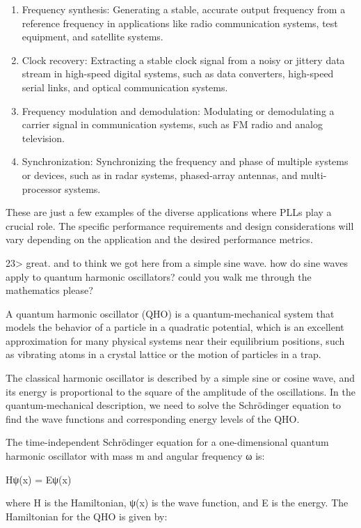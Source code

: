\documentclass[
]{article}
\begin{document}
\begin{enumerate}
\def\labelenumi{\arabic{enumi}.}
\item
  Frequency synthesis: Generating a stable, accurate output frequency
  from a reference frequency in applications like radio communication
  systems, test equipment, and satellite systems.
\item
  Clock recovery: Extracting a stable clock signal from a noisy or
  jittery data stream in high-speed digital systems, such as data
  converters, high-speed serial links, and optical communication
  systems.
\item
  Frequency modulation and demodulation: Modulating or demodulating a
  carrier signal in communication systems, such as FM radio and analog
  television.
\item
  Synchronization: Synchronizing the frequency and phase of multiple
  systems or devices, such as in radar systems, phased-array antennas,
  and multi-processor systems.
\end{enumerate}

These are just a few examples of the diverse applications where PLLs
play a crucial role. The specific performance requirements and design
considerations will vary depending on the application and the desired
performance metrics.

23\textgreater{} great. and to think we got here from a simple sine
wave. how do sine waves apply to quantum harmonic oscillators? could you
walk me through the mathematics please?

A quantum harmonic oscillator (QHO) is a quantum-mechanical system that
models the behavior of a particle in a quadratic potential, which is an
excellent approximation for many physical systems near their equilibrium
positions, such as vibrating atoms in a crystal lattice or the motion of
particles in a trap.

The classical harmonic oscillator is described by a simple sine or
cosine wave, and its energy is proportional to the square of the
amplitude of the oscillations. In the quantum-mechanical description, we
need to solve the Schrödinger equation to find the wave functions and
corresponding energy levels of the QHO.

The time-independent Schrödinger equation for a one-dimensional quantum
harmonic oscillator with mass m and angular frequency ω is:

Hψ(x) = Eψ(x)

where H is the Hamiltonian, ψ(x) is the wave function, and E is the
energy. The Hamiltonian for the QHO is given by:
\end{document}
